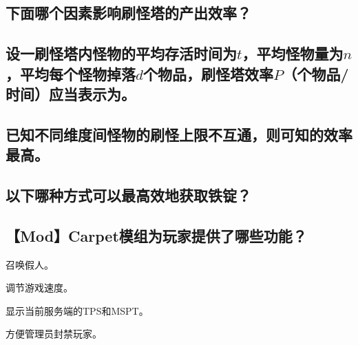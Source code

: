 \documentclass{exampaper}
\begin{document}

            \subsection{下面哪个因素影响刷怪塔的产出效率？}
            
            \subsection{设一刷怪塔内怪物的平均存活时间为$t$，平均怪物量为$n$，平均每个怪物掉落$d$个物品，刷怪塔效率$P$（个物品/时间）应当表示为\dash{1cm}。}
            
            \subsection{已知不同维度间怪物的刷怪上限不互通，则可知\dash{1cm}的效率最高。}
            
            \clearpage

            \subsection{以下哪种方式可以最高效地获取铁锭？}

            \subsection{\textbf{【Mod】}Carpet模组为玩家提供了哪些功能？}
                \begin{compactenum}
                    \item 召唤假人。
                    \item 调节游戏速度。
                    \item 显示当前服务端的TPS和MSPT。
                    \item 方便管理员封禁玩家。
                \end{compactenum}

\end{document}
